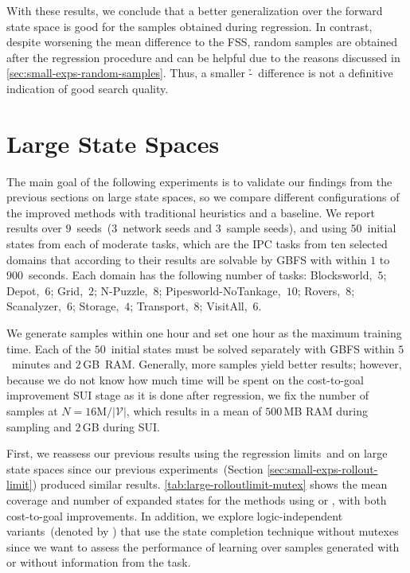 With these results, we conclude that a better generalization over the forward state space is good for the samples obtained during regression. In contrast, despite worsening the mean difference to the FSS, random samples are obtained after the regression procedure and can be helpful due to the reasons discussed in \cref{sec:small-exps-random-samples}. Thus, a smaller \mbox{\h-\hstar}~difference is not a definitive indication of good search quality.

\section{Large State Spaces}
\label{sec:large-experiments}

The main goal of the following experiments is to validate our findings from the previous sections on large state spaces, so we compare different configurations of the improved methods with traditional heuristics and a baseline. We report results over $9$~seeds~($3$~network seeds and $3$~sample seeds), and using $50$~initial states from each of \citet{ferber2022neural} moderate tasks, which are the IPC tasks from ten selected domains that according to their results are solvable by GBFS with \hff within $1$ to $900$~seconds. Each domain has the following number of tasks: Blocksworld,~$5$; Depot,~$6$; Grid,~$2$; N-Puzzle,~$8$; Pipesworld-NoTankage,~$10$; Rovers,~$8$; Scanalyzer,~$6$; Storage,~$4$; Transport,~$8$; VisitAll,~$6$.

We generate samples within one hour and set one hour as the maximum training time. Each of the $50$~initial states must be solved separately with GBFS within $5$~minutes and $2$\,GB~RAM. Generally, more samples yield better results; however, because we do not know how much time will be spent on the cost-to-goal improvement SUI stage as it is done after regression, we fix the number of samples at $N = 16\text{M} / |\mathcal{V}|$, which results in a mean of $500$\,MB RAM during sampling and $2$\,GB during SUI.

First, we reassess our previous results using the regression limits~\rlfacts and \rlmeanfx on large state spaces since our previous experiments~(Section \ref{sec:small-exps-rollout-limit}) produced similar results. \cref{tab:large-rolloutlimit-mutex} shows the mean coverage and number of expanded states for the methods using \rlfacts or \rlmeanfx, with both cost-to-goal improvements. In addition, we explore logic-independent variants~(denoted by \hnnnomutex) that use the state completion technique without mutexes since we want to assess the performance of learning over samples generated with or without information from the task.

